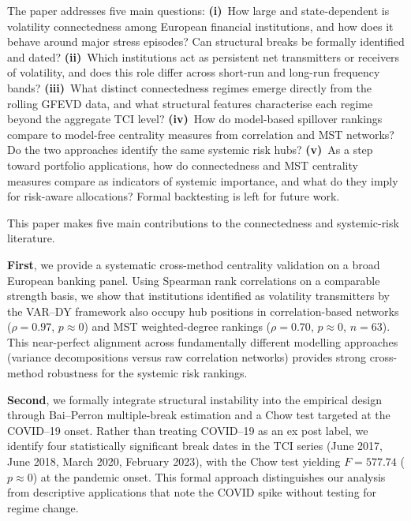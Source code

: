 
The paper addresses five main questions:
\textbf{(i)}~How large and state-dependent is volatility connectedness among European
financial institutions, and how does it behave around major stress episodes? Can
structural breaks be formally identified and dated?
\textbf{(ii)}~Which institutions act as persistent net transmitters or receivers of
volatility, and does this role differ across short-run and long-run frequency bands?
\textbf{(iii)}~What distinct connectedness regimes emerge directly from the rolling
GFEVD data, and what structural features characterise each regime beyond the aggregate
TCI level?
\textbf{(iv)}~How do model-based spillover rankings compare to model-free centrality
measures from correlation and MST networks? Do the two approaches identify the same
systemic risk hubs?
\textbf{(v)}~As a step toward portfolio applications, how do connectedness and MST
centrality measures compare as indicators of systemic importance, and what do they
imply for risk-aware allocations? Formal backtesting is left for future work.


This paper makes five main contributions to the connectedness and systemic-risk
literature. %

\textbf{First}, we provide a systematic cross-method centrality validation on a broad
European banking panel. Using Spearman rank correlations on a comparable strength basis, we show that institutions
identified as volatility transmitters by the VAR--DY framework also occupy hub
positions in correlation-based networks ($\rho = 0.97$, $p \approx 0$)
and MST weighted-degree rankings ($\rho = 0.70$, $p \approx 0$, $n = 63$). This near-perfect
alignment across fundamentally different modelling approaches (variance decompositions
versus raw correlation networks) provides strong cross-method robustness for the systemic
risk rankings.

\textbf{Second}, we formally integrate structural instability into the empirical design
through Bai--Perron multiple-break estimation and a Chow test targeted at the COVID--19
onset. Rather than treating COVID--19 as an ex post label, we identify four statistically
significant break dates in the TCI series (June 2017, June 2018, March 2020, February 2023),
with the Chow test yielding $F = 577.74$ ($p \approx 0$) at the pandemic onset. This
formal approach distinguishes our analysis from descriptive applications that note the
COVID spike without testing for regime change.


